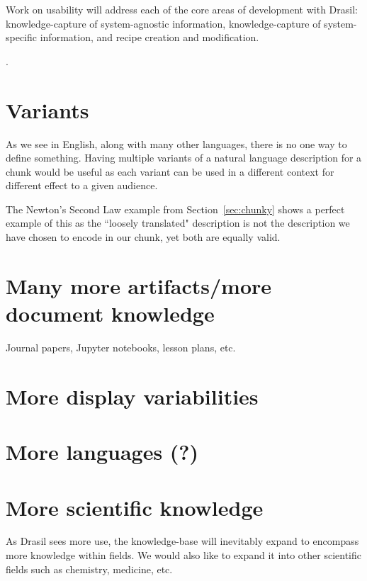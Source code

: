 Work on usability will address each of the core areas of development with
Drasil: knowledge-capture of system-agnostic information,
knowledge-capture of system-specific information, and recipe creation and
modification.

.

\section{Variants} 


As we see in English, along with many other languages, there is no one way to 
define something. Having multiple variants of a natural language description 
for a chunk would be useful as each variant can be used in a different context 
for different effect to a given audience.

The Newton's Second Law example from Section~\ref{sec:chunky} shows a perfect 
example of this as the ``loosely translated" description is not the description 
we have chosen to encode in our chunk, yet both are equally valid.

\section{Many more artifacts/more document knowledge}

Journal papers, Jupyter notebooks, lesson plans, etc.

\section{More display variabilities}

\section{More languages (?)}


\section{More scientific knowledge}

As Drasil sees more use, the knowledge-base will inevitably expand to encompass 
more knowledge within fields. We would also like to expand it into other 
scientific fields such as chemistry, medicine, etc.

